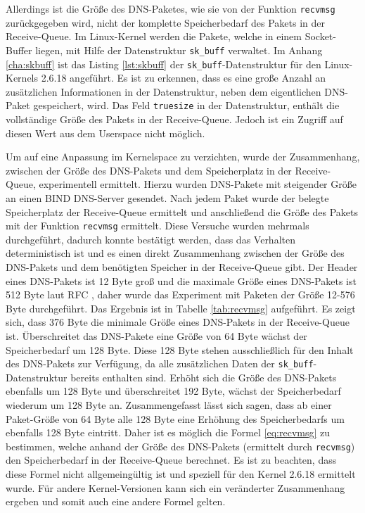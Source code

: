 \documentclass[a4paper, 12pt, BCOR10mm, DIV12, toc=bibliography, toc=listof, german]{scrbook}
\begin{document}
		Allerdings ist die Größe des DNS-Paketes, wie sie von der Funktion \texttt{recvmsg}
		zurückgegeben wird, nicht der komplette Speicherbedarf des Pakets in der Receive-Queue. Im
		Linux-Kernel werden die Pakete, welche in einem Socket-Buffer liegen, mit Hilfe der
		Datenstruktur \texttt{sk\_buff} verwaltet. Im Anhang \ref{cha:skbuff} ist das Listing
		\ref{lst:skbuff} der \texttt{sk\_buff}-Datenstruktur für den Linux-Kernels 2.6.18 angeführt. Es ist
		zu erkennen, dass es eine große Anzahl an zusätzlichen Informationen in der Datenstruktur, neben
		dem eigentlichen DNS-Paket gespeichert, wird. Das Feld \texttt{truesize} in der Datenstruktur,
		enthält die vollständige Größe des Pakets in der Receive-Queue. Jedoch ist ein Zugriff auf
		diesen Wert aus dem Userspace nicht möglich.
		
		Um auf eine Anpassung im Kernelspace zu verzichten, wurde der Zusammenhang, zwischen der Größe
		des DNS-Pakets und dem Speicherplatz in der Receive-Queue, experimentell ermittelt. Hierzu
		wurden DNS-Pakete mit steigender Größe an einen BIND DNS-Server gesendet. Nach jedem Paket wurde
		der belegte Speicherplatz der Receive-Queue ermittelt und anschließend die Größe des Pakets mit
		der Funktion \texttt{recvmsg} ermittelt. Diese Versuche wurden mehrmals durchgeführt, dadurch
		konnte bestätigt werden, dass das Verhalten deterministisch ist und es einen direkt Zusammenhang
		zwischen der Größe des DNS-Pakets und dem benötigten Speicher in der Receive-Queue gibt. Der
		Header eines DNS-Pakets ist 12 Byte groß und die maximale Größe eines DNS-Pakets ist 512 Byte
		laut RFC \cite{rfc1035}, daher wurde das Experiment mit Paketen der Größe 12-576 Byte
		durchgeführt. Das Ergebnis ist in Tabelle \ref{tab:recvmsg} aufgeführt. Es zeigt sich, dass 376
		Byte die minimale Größe eines DNS-Pakets in der Receive-Queue ist. Überschreitet das DNS-Pakete
		eine Größe von 64 Byte wächst der Speicherbedarf um 128 Byte. Diese 128 Byte stehen
		ausschließlich für den Inhalt des DNS-Pakets zur Verfügung, da alle zusätzlichen Daten der
		\texttt{sk\_buff}-Datenstruktur bereits enthalten sind. Erhöht sich die Größe des DNS-Pakets
		ebenfalls um 128 Byte und überschreitet 192 Byte, wächst der Speicherbedarf wiederum um 128 Byte
		an. Zusammengefasst lässt sich sagen, dass ab einer Paket-Größe von 64 Byte alle 128 Byte eine
		Erhöhung des Speicherbedarfs um ebenfalls 128 Byte eintritt. Daher ist es möglich die Formel
		\ref{eq:recvmsg} zu bestimmen, welche anhand der Größe des DNS-Pakets (ermittelt durch
		\texttt{recvmsg}) den Speicherbedarf in der Receive-Queue berechnet. Es ist zu beachten, dass
		diese Formel nicht allgemeingültig ist und speziell für den Kernel 2.6.18 ermittelt wurde. Für
		andere Kernel-Versionen kann sich ein veränderter Zusammenhang ergeben und somit auch eine
		andere Formel gelten.		
\end{document}
